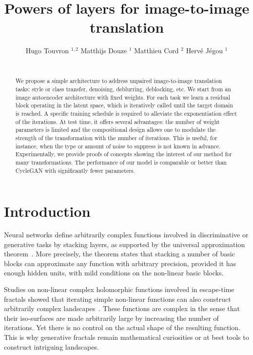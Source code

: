 \documentclass[a4paper,10pt]{extarticle}
\title{Powers of layers for image-to-image translation}
\author{Hugo Touvron $^{1,2}$ 
\hspace{0.32cm} 
Matthijs Douze $^1$ 
\hspace{0.32cm} 
Matthieu Cord $^2$
\hspace{0.32cm} 
Herv\'e J\'egou $^1$
\\
~\\
\scalebox{1.}{$^1$ Facebook AI Research \hspace{0.6cm} $^2$ Sorbonne University}
\date{}
}
\begin{document}
\maketitle

\begin{abstract}
We propose a simple architecture to address unpaired image-to-image  translation tasks: style or class transfer, denoising, deblurring, deblocking, etc. 
We start from an image autoencoder architecture with fixed weights. 
For each task we learn a residual block operating in the latent space, which is iteratively called until the target domain is reached. 
A specific training schedule is required to alleviate the exponentiation effect of the iterations. 
At test time, it offers several advantages: the number of weight parameters is limited and the compositional design allows one to modulate the strength of the transformation with the number of iterations. 
This is useful, for instance, when the type or amount of noise to suppress is not known in advance.  
Experimentally, we provide proofs of concepts showing the interest of our method for many transformations. 
The performance of our model is comparable or better than CycleGAN with significantly fewer parameters.
\end{abstract}

\section{Introduction}\label{sec:introduction}


Neural networks define arbitrarily complex functions involved in discriminative or generative tasks by stacking layers, as supported by the universal approximation theorem~\cite{hornik1989multilayer,montufar2014universal,goodfellow2016deep}.
More precisely, the theorem states that stacking a number of basic blocks can approximate any function with arbitrary precision, provided it has enough hidden units, with mild conditions on the non-linear basic blocks.

Studies on non-linear complex holomorphic functions involved in escape-time fractals showed that iterating simple non-linear functions can also construct arbitrarily complex landscapes~\cite{barnsley1988science}.
These functions are complex in the sense that their iso-surfaces are made arbitrarily large by increasing the number of iterations. 
Yet there is no control on the actual shape of the resulting function. This is why generative fractals remain mathematical curiosities or at best
tools to construct intriguing landscapes. 
\end{document}
